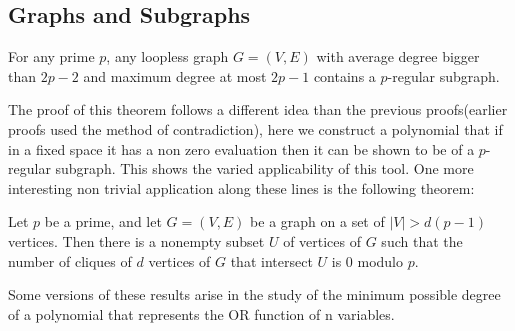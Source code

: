 \subsection{Graphs and Subgraphs}
\begin{theorem}
	For any prime $p$, any loopless graph $G = (V, E)$ with average degree bigger than $2p - 2$ and maximum degree at most $2p - 1$ contains a $p$-regular subgraph.
\end{theorem}
The proof of this theorem follows a different idea than the previous proofs(earlier proofs used the method of contradiction), here we construct a polynomial that if in a fixed space it has a non zero evaluation then it can be shown to be of a $p$-regular subgraph. This shows the varied applicability of this tool. One more interesting non trivial application along these lines is the following theorem:
\begin{theorem}
	Let $p$ be a prime, and let $G = (V, E)$ be a graph on a set of $|V| > d(p - 1)$ vertices. Then there is a nonempty subset $U$ of vertices of $G$ such that the number of cliques of $d$ vertices of $G$ that intersect $U$ is $0$ modulo $p$.
\end{theorem}
Some versions of these results arise in the study of the minimum possible degree of a polynomial that represents the OR function of n variables.

